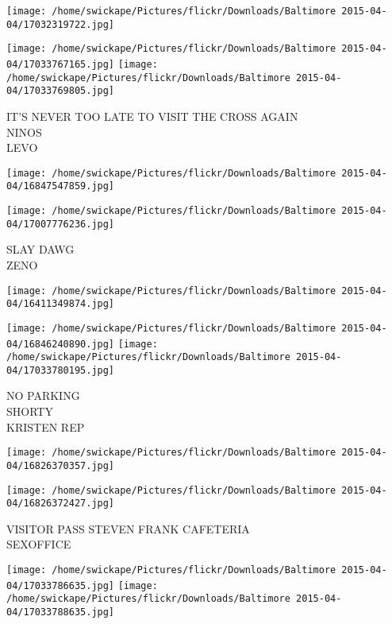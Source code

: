 \documentclass[10pt,letterpaper]{article}
\begin{document}
\texttt{[image: /home/swickape/Pictures/flickr/Downloads/Baltimore 2015-04-04/17032319722.jpg]}

\vspace{0.25in}
\texttt{[image: /home/swickape/Pictures/flickr/Downloads/Baltimore 2015-04-04/17033767165.jpg]}
\texttt{[image: /home/swickape/Pictures/flickr/Downloads/Baltimore 2015-04-04/17033769805.jpg]}

IT'S NEVER TOO LATE TO VISIT THE CROSS AGAIN\\
NINOS\\
LEVO\\
\pagebreak

\texttt{[image: /home/swickape/Pictures/flickr/Downloads/Baltimore 2015-04-04/16847547859.jpg]}

\vspace{0.25in}
\texttt{[image: /home/swickape/Pictures/flickr/Downloads/Baltimore 2015-04-04/17007776236.jpg]}

SLAY DAWG\\
ZENO\\
\pagebreak

\texttt{[image: /home/swickape/Pictures/flickr/Downloads/Baltimore 2015-04-04/16411349874.jpg]}

\vspace{0.25in}
\texttt{[image: /home/swickape/Pictures/flickr/Downloads/Baltimore 2015-04-04/16846240890.jpg]}
\texttt{[image: /home/swickape/Pictures/flickr/Downloads/Baltimore 2015-04-04/17033780195.jpg]}

NO PARKING\\
SHORTY\\
KRISTEN REP\\
\pagebreak

\texttt{[image: /home/swickape/Pictures/flickr/Downloads/Baltimore 2015-04-04/16826370357.jpg]}

\vspace{0.25in}
\texttt{[image: /home/swickape/Pictures/flickr/Downloads/Baltimore 2015-04-04/16826372427.jpg]}

VISITOR PASS STEVEN FRANK CAFETERIA\\
SEXOFFICE\\
\pagebreak

\texttt{[image: /home/swickape/Pictures/flickr/Downloads/Baltimore 2015-04-04/17033786635.jpg]}
\texttt{[image: /home/swickape/Pictures/flickr/Downloads/Baltimore 2015-04-04/17033788635.jpg]}
\end{document}
